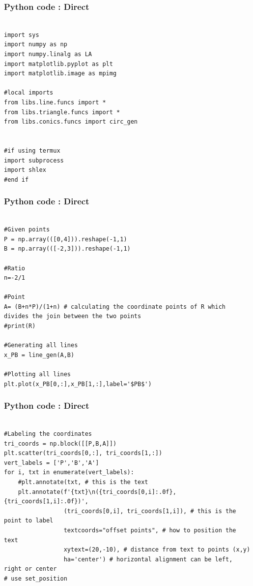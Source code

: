 \documentclass{beamer}
\begin{document}
\begin{frame}[fragile]
	\frametitle{Python code : Direct }
	
	\begin{lstlisting}

import sys                                        
import numpy as np
import numpy.linalg as LA
import matplotlib.pyplot as plt
import matplotlib.image as mpimg

#local imports
from libs.line.funcs import *
from libs.triangle.funcs import *
from libs.conics.funcs import circ_gen


#if using termux
import subprocess
import shlex
#end if
\end{lstlisting}
\end{frame}
\begin{frame}[fragile]
	\frametitle{Python code : Direct }
	
	\begin{lstlisting}

#Given points
P = np.array(([0,4])).reshape(-1,1)
B = np.array(([-2,3])).reshape(-1,1)

#Ratio
n=-2/1

#Point
A= (B+n*P)/(1+n) # calculating the coordinate points of R which divides the join between the two points
#print(R)

#Generating all lines
x_PB = line_gen(A,B)

#Plotting all lines
plt.plot(x_PB[0,:],x_PB[1,:],label='$PB$')
\end{lstlisting}
\end{frame}
\begin{frame}[fragile]
	\frametitle{Python code : Direct }
	
	\begin{lstlisting}

#Labeling the coordinates
tri_coords = np.block([[P,B,A]])
plt.scatter(tri_coords[0,:], tri_coords[1,:])
vert_labels = ['P','B','A']
for i, txt in enumerate(vert_labels):
    #plt.annotate(txt, # this is the text
    plt.annotate(f'{txt}\n({tri_coords[0,i]:.0f}, {tri_coords[1,i]:.0f})',
                 (tri_coords[0,i], tri_coords[1,i]), # this is the point to label
                 textcoords="offset points", # how to position the text
                 xytext=(20,-10), # distance from text to points (x,y)
                 ha='center') # horizontal alignment can be left, right or center
# use set_position
\end{lstlisting}
\end{frame}
\end{document}
